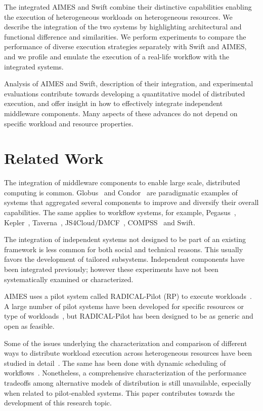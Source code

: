 \documentclass[10pt, conference, compsocconf]{IEEEtran}
\begin{document}
The integrated AIMES and Swift combine their distinctive capabilities
enabling the execution of heterogeneous workloads on heterogeneous resources.
We describe the integration of the two systems by highlighting architectural
and functional difference and similarities. We perform experiments to compare
the performance of diverse execution strategies separately with Swift and
AIMES, and we profile and emulate the execution of a real-life workflow with
the integrated systems.

Analysis of AIMES and Swift, description of their integration, and
experimental evaluations contribute towards developing a
quantitative model of distributed execution, and offer insight in how to
effectively integrate independent middleware components. Many aspects of
these advances do not depend on specific workload and resource properties.


\section{Related Work}\label{sec:rwork}

The integration of middleware components to enable large scale, distributed
computing is common. Globus~\cite{foster1997globus} and
Condor~\cite{thain2005distributed} are paradigmatic examples of systems that
aggregated several components to improve and diversify their overall
capabilities. The same applies to workflow systems, for example,
Pegasus~\cite{deelman2005pegasus}, Kepler~\cite{ludascher2006scientific},
Taverna~\cite{wolstencroft2013taverna},
JS4Cloud/DMCF~\cite{marozzo2015js4cloud}, COMPSS~\cite{lordan2014servicess} and
Swift.

The integration of independent systems not designed to be part of an existing
framework is less common for both social and technical reasons. This usually
favors the development of tailored subsystems.  Independent components have
been integrated previously; however these experiments have not been
systematically examined or characterized.

AIMES uses a pilot system called RADICAL-Pilot (RP) to execute
workloads~\cite{merzky2015radical}. A large number of pilot systems have been
developed for specific resources or type of
workloads~\cite{turilli2017comprehensive}, but RADICAL-Pilot has been
designed to be as generic and open as feasible.

Some of the issues underlying the characterization and comparison of
different ways to distribute workload execution across heterogeneous
resources have been studied in
detail~\cite{blythe2003role,adler1995distributed}. The same has been done
with dynamic scheduling of
workflows~\cite{prodan2005dynamic,fard2013truthful}. Nonetheless, a
comprehensive characterization of the performance tradeoffs among alternative
models of distribution is still unavailable, especially when related to
pilot-enabled systems. This paper contributes towards the development of this
research topic.
\end{document}
